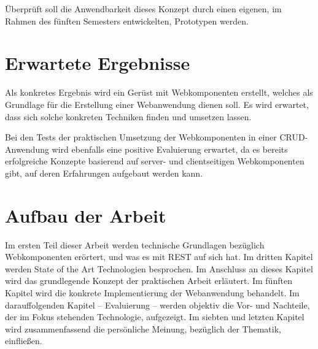Überprüft soll die Anwendbarkeit dieses Konzept durch einen eigenen, im Rahmen des fünften Semesters entwickelten, Prototypen werden.

\section{Erwartete Ergebnisse}

Als konkretes Ergebnis wird ein Gerüst mit Webkomponenten erstellt, welches als Grundlage für die Erstellung einer Webanwendung dienen soll. Es wird erwartet, dass sich solche konkreten Techniken finden und umsetzen lassen.

Bei den Tests der praktischen Umsetzung der Webkomponenten in einer CRUD-Anwendung wird ebenfalls eine positive Evaluierung erwartet, da es bereits erfolgreiche Konzepte basierend auf server- und clientseitigen Webkomponenten gibt, auf deren Erfahrungen aufgebaut werden kann.

\section{Aufbau der Arbeit}
Im ersten Teil dieser Arbeit werden technische Grundlagen bezüglich Webkomponenten erörtert, und was es mit REST auf sich hat. Im dritten Kapitel werden State of the Art Technologien besprochen. Im Anschluss an dieses Kapitel wird das grundlegende Konzept der praktischen Arbeit erläutert. Im fünften Kapitel wird die konkrete Implementierung der Webanwendung behandelt. Im darauffolgenden Kapitel -- Evaluierung -- werden objektiv die Vor- und Nachteile, der im Fokus stehenden Technologie, aufgezeigt. Im siebten und letzten Kapitel wird  zusammenfassend die persönliche Meinung, bezüglich der Thematik, einfließen. 